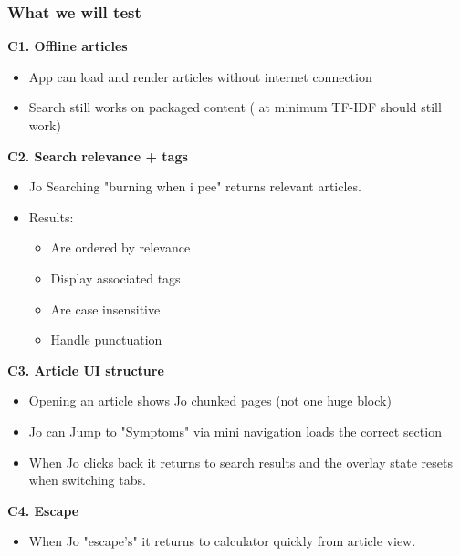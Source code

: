 \documentclass[a4paper,12pt]{article}
\begin{document}
\subsubsection{What we will test}
\textbf{C1. Offline articles}
\begin{itemize}
    \item App can load and render articles without internet connection
    \item Search still works on packaged content ( at minimum TF-IDF should still work)
\end{itemize}
\textbf{C2. Search relevance + tags}
\begin{itemize}
    \item Jo Searching "burning when i pee" returns relevant articles.
    \item Results: \begin{itemize}
        \item Are ordered by relevance
        \item Display associated tags
        \item Are case insensitive
        \item Handle punctuation
    \end{itemize}
    
\end{itemize}
\textbf{C3. Article UI structure}
\begin{itemize}
    \item Opening an article shows Jo chunked pages (not one huge block)
    \item Jo can Jump to "Symptoms" via mini navigation loads the correct section
    \item When Jo clicks back it returns to search  results and the overlay state resets when switching tabs.
\end{itemize}
\textbf{C4. Escape}
\begin{itemize}
    \item When Jo "escape's" it returns to calculator quickly from article view.
\end{itemize}
\end{document}
